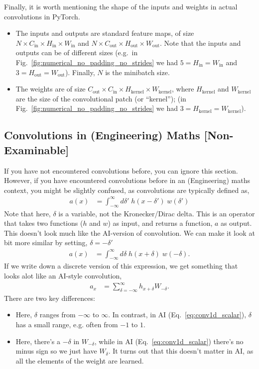 \documentclass{article}
\newcommand{\Cin}{C_\text{in}}
\newcommand{\Cout}{C_\text{out}}
\newcommand{\Win}{W_\text{in}}
\newcommand{\Wout}{W_\text{out}}
\newcommand{\Wk}{W_\text{kernel}}
\newcommand{\Hin}{H_\text{in}}
\newcommand{\Hout}{H_\text{out}}
\newcommand{\Hk}{H_\text{kernel}}
\begin{document}
Finally, it is worth mentioning the shape of the inputs and weights in actual convolutions in PyTorch.
\begin{itemize}
  \item The inputs and outputs are standard feature maps, of size $N \times \Cin \times \Hin \times \Win$ and $N \times \Cout \times \Hout \times \Wout$. Note that the inputs and outputs can be of different sizes (e.g.\ in Fig.~\ref{fig:numerical_no_padding_no_strides} we had $5 = \Hin = \Win$ and $3 = \Hout = \Wout$). Finally, $N$ is the minibatch size.
  \item The weights are of size $\Cout \times \Cin \times \Hk \times \Wk$, where $\Hk$ and $\Wk$ are the size of the convolutional patch (or ``kernel''); (in Fig.~\ref{fig:numerical_no_padding_no_strides} we had $3 = \Hk = \Wk$).
\end{itemize}

\subsection{Convolutions in (Engineering) Maths [Non-Examinable]}

If you have not encountered convolutions before, you can ignore this section.
However, if you have encountered convolutions before in an (Engineering) maths context, you might be slightly confused, as convolutions are typically defined as,
\begin{align}
  \label{eq:math_conv}
  a(x) &= \int_{-\infty}^\infty d\delta' \; h(x - \delta') \; w(\delta') 
\end{align}
Note that here, $\delta$ is a variable, not the Kronecker/Dirac delta.
This is an operator that takes two functions ($h$ and $w$) as input, and returns a function, $a$ as output.
This doesn't look much like the AI-version of convolution.
We can make it look at bit more similar by setting, $\delta = -\delta'$
\begin{align}
  a(x) &= \int_{-\infty}^\infty d\delta \; h(x + \delta) \; w(-\delta).
\end{align}
If we write down a discrete version of this expression, we get something that looks alot like an AI-style convolution,
\begin{align}
  a_{x} &= \sum_{\delta=-\infty}^\infty h_{x+\delta} W_{-\delta}.
\end{align}
There are two key differences:
\begin{itemize}
  \item Here, $\delta$ ranges from $-\infty$ to $\infty$.  In contrast, in AI (Eq.~\ref{eq:conv1d_scalar}), $\delta$ has a small range, e.g. often from $-1$ to $1$.
  \item Here, there's a $-\delta$ in $W_{-\delta}$, while in AI (Eq.~\ref{eq:conv1d_scalar}) there's no minus sign so we just have $W_\delta$.  It turns out that this doesn't matter in AI, as all the elements of the weight are learned.
\end{itemize}
\end{document}
